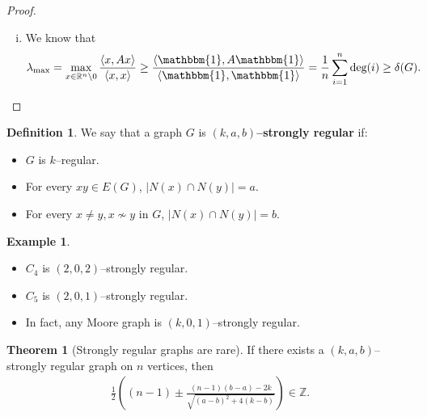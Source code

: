 \documentclass{article}
\theoremstyle{definition}
\newtheorem{theorem}{Theorem}[section]
\newtheorem{example}{Example}[section]
\newtheorem{defn}{Definition}[section]
\begin{document}
\begin{proof}
\begin{enumerate}[(i)]
        $(\implies)$: Let $-\Delta$ be an eigenvalue of $G$ with corresponding eigenvector $x=(x_1,\ldots,x_n)$. Let $x_i$ be such that $|x_i|=1$ and assume that $x_i=1$. We have 
        \begin{align*}
            -\Delta = - \Delta x_i = \sum_{j \sim i}^{} x_j \implies \text{deg}(i)=\Delta \text{ and } x_j = -1 ~\forall j \sim i.
        \end{align*}
        Now repeat this for all $j \in N(i)$ to see that $\text{deg}(j)=\Delta$ and $x_k = 1 ~\forall k \sim j \sim i$. Analogously keep repeating until we reach all vertices in $G$ and see that $G$ is $\Delta$--regular and $x = (1,\ldots,1,-1,\ldots,-1)$ up to a permutation of the coordinates. Moreover, $V(G) = \{j \mid x_j=1\} \cup \{j \mid x_j = -1\}$ defines a bipartition of $G$.
        \item We know that
        \begin{align*}
            \lambda_{\max} = \max_{x \in \mathbb{R}^n\setminus 0}\frac{\langle x,Ax \rangle}{\langle x,x \rangle} \ge \frac{\langle \mathbbm{1},A \mathbbm{1} \rangle}{\langle \mathbbm{1},\mathbbm{1}\rangle} = \frac{1}{n} \sum_{i=1}^{n} \text{deg}(i) \ge \delta(G).
        \end{align*}
    \end{enumerate}
\end{proof}
\begin{defn}
    We say that a graph $G$ is \textbf{$(k,a,b)$--strongly regular} if:
    \begin{itemize}
        \item $G$ is $k$--regular.
        \item For every $xy \in E(G)$, $|N(x) \cap N(y)| = a$.
        \item For every $x \neq y, x \not\sim y$ in $G$, $|N(x) \cap N(y)|=b$.
    \end{itemize}
\end{defn}
\begin{example}
    \begin{itemize}
        \item $C_4$ is $(2,0,2)$--strongly regular.
        \item $C_5$ is $(2,0,1)$--strongly regular.
        \item In fact, any Moore graph is $(k,0,1)$--strongly regular.
    \end{itemize}
\end{example}
\begin{theorem}[Strongly regular graphs are rare]\label{7.2}
    If there exists a $(k,a,b)$--strongly regular graph on $n$ vertices, then 
    \begin{align*}
        \frac{1}{2}\left((n-1) \pm \frac{(n-1)(b-a)-2k}{\sqrt{(a-b)^2+4(k-b)}} \right) \in \mathbb{Z}.
    \end{align*}
\end{theorem}
\end{document}
